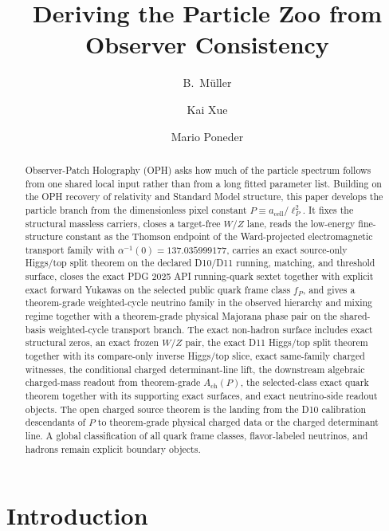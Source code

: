 \documentclass[11pt]{article}
\title{Deriving the Particle Zoo from\\
Observer Consistency}
\author{B.\ M\"uller \and Kai Xue \and Mario Poneder}
\date{\OPHPaperReleaseDate}
\begin{document}
\maketitle
\OPHPaperReleaseBanner

\begin{abstract}
Observer-Patch Holography (OPH) asks how much of the particle spectrum follows from one shared local input rather than from a long fitted parameter list. Building on the OPH recovery of relativity and Standard Model structure, this paper develops the particle branch from the dimensionless pixel constant \(P \equiv a_{\mathrm{cell}}/\ell_P^2\). It fixes the structural massless carriers, closes a target-free \(W/Z\) lane, reads the low-energy fine-structure constant as the Thomson endpoint of the Ward-projected electromagnetic transport family with \(\alpha^{-1}(0)=137.035999177\), carries an exact source-only Higgs/top split theorem on the declared D10/D11 running, matching, and threshold surface, closes the exact PDG 2025 API running-quark sextet together with explicit exact forward Yukawas on the selected public quark frame class \(f_P\), and gives a theorem-grade weighted-cycle neutrino family in the observed hierarchy and mixing regime together with a theorem-grade physical Majorana phase pair on the shared-basis weighted-cycle transport branch. The exact non-hadron surface includes exact structural zeros, an exact frozen \(W/Z\) pair, the exact D11 Higgs/top split theorem together with its compare-only inverse Higgs/top slice, exact same-family charged witnesses, the conditional charged determinant-line lift, the downstream algebraic charged-mass readout from theorem-grade \(A_{\mathrm{ch}}(P)\), the selected-class exact quark theorem together with its supporting exact surfaces, and exact neutrino-side readout objects. The open charged source theorem is the landing from the D10 calibration descendants of \(P\) to theorem-grade physical charged data or the charged determinant line. A global classification of all quark frame classes, flavor-labeled neutrinos, and hadrons remain explicit boundary objects.
\end{abstract}

\section{Introduction}
\end{document}
